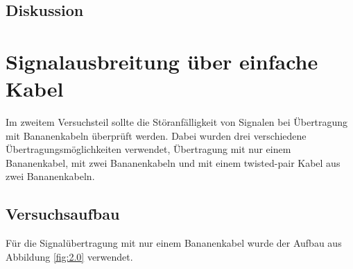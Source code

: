 \documentclass[12pt,a4paper]{article}
\begin{document}
\subsection{Diskussion}





\section{Signalausbreitung über einfache Kabel}
Im zweitem Versuchsteil sollte die Störanfälligkeit von Signalen bei Übertragung mit Bananenkabeln überprüft werden. Dabei wurden drei verschiedene Übertragungsmöglichkeiten verwendet, Übertragung mit nur einem Bananenkabel, mit zwei Bananenkabeln und mit einem twisted-pair Kabel aus zwei Bananenkabeln.
\subsection{Versuchsaufbau}
Für die Signalübertragung mit nur einem Bananenkabel wurde der Aufbau aus Abbildung \ref{fig:2.0} verwendet.
\end{document}
